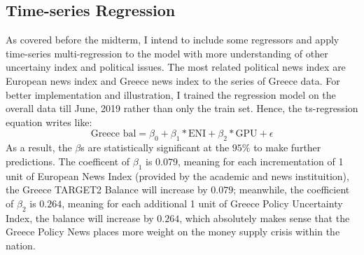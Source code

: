 \documentclass[12pt]{article}
\begin{document}
\begin{figure}[!tbp]
\begin{minipage}[b]{0.34\textwidth}
    \caption{}
  \end{minipage}
\end{figure}

\subsection{Time-series Regression}
As covered before the midterm, I intend to include some regressors and apply time-series multi-regression to the model with more understanding of other uncertainy index and political issues. The most related political news index are European news index and Greece news index to the series of Greece data. For better implementation and illustration, I trained the regression model on the overall data till June, 2019 rather than only the train set. Hence, the ts-regression equation writes like: 
$$
\text{Greece bal} = \beta_0 + \beta_1 * \text{ENI} + \beta_2 * \text{GPU} + \epsilon
$$
As a result, the $\beta$s are statistically significant at the $95\%$ to make further predictions. The coefficent of $\beta_1$ is $0.079$, meaning for each incrementation of 1 unit of European News Index (provided by the academic and news instituition), the Greece TARGET2 Balance will increase by $0.079$; meanwhile, the coefficient of $\beta_2$ is $0.264$, meaning for each additional 1 unit of Greece Policy Uncertainty Index, the balance will increase by $0.264$, which absolutely makes sense that the Greece Policy News places more weight on the money supply crisis within the nation. 
\end{document}
